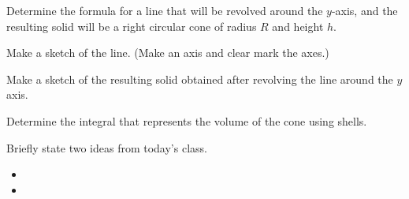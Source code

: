 \begin{problem}
\item Determine the formula for a line that will be revolved
      around the $y$-axis, and the resulting solid will be a right
      circular cone of radius $R$ and height $h$.
  \begin{subproblem}
    \item Make a sketch of the line. (Make an axis and clear mark the
      axes.)
      \vfill

    \item Make a sketch of the resulting solid obtained after
      revolving the line around the $y$ axis.
      \vfill

    \item Determine the integral that represents the volume of the
      cone using shells.
      \vfill
      
  \end{subproblem}
\end{problem}

\postClass

\begin{problem}
\item Briefly state two ideas from today's class.
  \begin{itemize}
  \item 
  \item 
  \end{itemize}
\item 
  \begin{subproblem}
    \item
  \end{subproblem}
\end{problem}




